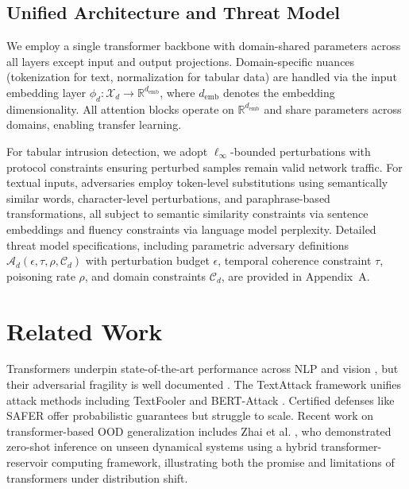 \documentclass[12pt,a4paper]{article}
\theoremstyle{definition}
\begin{document}
\subsection{Unified Architecture and Threat Model}

We employ a single transformer backbone with domain-shared parameters across all layers except input and output projections. Domain-specific nuances (tokenization for text, normalization for tabular data) are handled via the input embedding layer $\phi_d: \mathcal{X}_d \to \mathbb{R}^{d_{\text{emb}}}$, where $d_{\text{emb}}$ denotes the embedding dimensionality. All attention blocks operate on $\mathbb{R}^{d_{\text{emb}}}$ and share parameters across domains, enabling transfer learning.

For tabular intrusion detection, we adopt $\ell_\infty$-bounded perturbations with protocol constraints ensuring perturbed samples remain valid network traffic. For textual inputs, adversaries employ token-level substitutions using semantically similar words, character-level perturbations, and paraphrase-based transformations, all subject to semantic similarity constraints via sentence embeddings and fluency constraints via language model perplexity. Detailed threat model specifications, including parametric adversary definitions $\mathcal{A}_d(\epsilon, \tau, \rho, \mathcal{C}_d)$ with perturbation budget $\epsilon$, temporal coherence constraint $\tau$, poisoning rate $\rho$, and domain constraints $\mathcal{C}_d$, are provided in Appendix~A.

\section{Related Work}

Transformers underpin state-of-the-art performance across NLP and vision \citep{vaswani2017attention,devlin2019bert,dosovitskiy2021image}, but their adversarial fragility is well documented \citep{kheddar2024transformers,xu2024large}. The TextAttack framework \citep{morris2020textattack} unifies attack methods including TextFooler \citep{jin2020bert} and BERT-Attack \citep{li2020bert}. Certified defenses like SAFER \citep{ye2020safer} offer probabilistic guarantees but struggle to scale. Recent work on transformer-based OOD generalization includes Zhai et al. \citep{zhai2025bridging}, who demonstrated zero-shot inference on unseen dynamical systems using a hybrid transformer-reservoir computing framework, illustrating both the promise and limitations of transformers under distribution shift.
\end{document}
